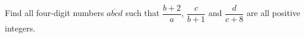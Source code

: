 Find all four-digit numbers $\overline{abcd}$ such that $\dfrac{b+2}{a}$, $\dfrac{c}{b+1}$ and $\dfrac{d}{c+8}$ are all positive integers.
